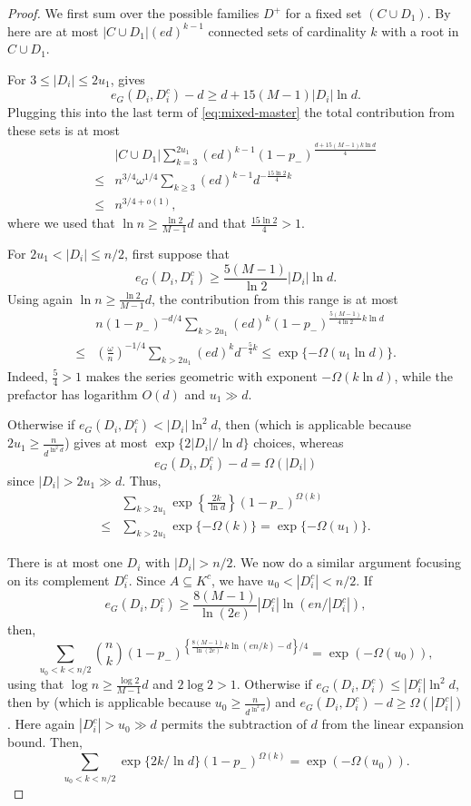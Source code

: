 \documentclass[notitlepage]{scrartcl}
\begin{document}
\begin{proof}
We first sum over the possible families $D^+$ for a fixed set $(C \cup D_1)$.
By  here are at most $|C \cup D_1|(ed)^{k-1}$ connected sets of cardinality $k$ with a root in $C \cup D_1$.

For $3\le |D_i|\le2u_1$,  gives
\begin{equation*}\label{eq:component-small-boundary}
 e_G(D_i, D_i^c)-d \ge d+15(M-1)|D_i|\ln d.
\end{equation*}
Plugging this into the last term of \eqref{eq:mixed-master} the total contribution from these sets is at most
\begin{align*}
    &|C \cup D_1| \sum_{k=3}^{2u_1} (ed)^{k-1} (1-p_-)^{\frac{d+15(M-1)k \ln d}{4}}\\
    \leq & n^{3/4} \omega^{1/4} \sum_{k \geq 3} (ed)^{k-1} d^{-\frac{15 \ln 2}{4} k}\\
    \leq & n^{3/4+o(1)},
\end{align*}
where we used that $\ln n \geq \frac{\ln 2}{M-1} d$ and that $\frac{15 \ln 2}{4}>1$.

For $2u_1<|D_i|\le n/2$, first suppose that
\[
 e_G(D_i, D_i^c) \ge \frac{5(M-1)}{\ln 2}|D_i|\ln d.
\]
Using again $\ln n \geq \frac{\ln 2}{M-1}d$, the contribution from this range is at most
\begin{align*}
    &n (1-p_-)^{-d/4}\sum_{k>2u_1}(ed)^k (1-p_-)^{\frac{5(M-1)}{4 \ln 2} k \ln d}\\
    \leq & \left(\frac{\omega}{n} \right)^{-1/4} \sum_{k >2u_1} (ed)^k d^{-\frac{5}{4}k}
 \le\exp\{-\Omega(u_1\ln d)\}.
\end{align*}
Indeed, $\frac{5}{4}>1$ makes the series geometric with exponent $-\Omega(k\ln d)$, while the prefactor has logarithm $O(d)$ and $u_1\gg d$.

Otherwise if $e_G(D_i, D_i^c)<|D_i|\ln^2 d$, then  (which is applicable because $2u_1 \geq \frac{n}{d^{\ln^2 d}}$) gives at most $\exp\{2|D_i|/\ln d\}$ choices, whereas
\[
 e_G(D_i, D_i^c)-d = \Omega(|D_i|)
\]
since $|D_i|>2u_1 \gg d$. Thus,
\begin{align*}
    &\sum_{k > 2u_1} \exp\left\{ \frac{2k}{\ln d}\right\} (1-p_-)^{\Omega(k)}\\
    \leq & \sum_{k > 2u_1} \exp\{-\Omega(k)\} = \exp\{-\Omega(u_1)\}.
\end{align*}

There is at most one $D_i$ with $|D_i|>n/2$. We now do a similar argument focusing on its complement $D_i^c$. Since $A\subseteq K^c$, we have $u_0<|D_i^c|<n/2$.
If
\[
 e_G(D_i, D_i^c)\ge \frac{8(M-1)}{\ln(2e)}|D_i^c|\ln(en/|D_i^c|),
\]
then,
\[
 \sum_{u_0<k<n/2}\binom nk (1-p_-)^{\left\{\frac{8(M-1)}{\ln(2e)} k\ln(en/k)-d\right\}/4} =\exp(-\Omega(u_0)),
\]
using that $\log n \geq \frac{\log 2}{M-1} d$ and $2 \log 2>1$.
Otherwise if $e_G(D_i, D_i^c)\le |D_i^c|\ln^2d$, then by  (which is applicable because $u_0 \geq \frac{n}{d^{\ln^2 d}}$) and $e_G(D_i, D_i^c)-d\ge \Omega(|D_i^c|)$. Here again $|D_i^c|>u_0\gg d$ permits the subtraction of $d$ from the linear expansion bound. Then,
\[
\sum_{u_0<k<n/2}\exp\{2k/\ln d\}(1-p_-)^{\Omega(k)}=\exp(-\Omega(u_0)).
\]


\end{proof}
\end{document}
